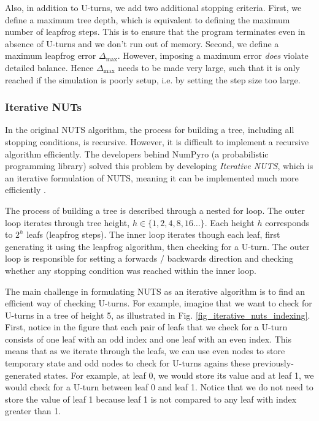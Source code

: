 \documentclass[12pt]{article}
\begin{document}
Also, in addition to U-turns, we add two additional stopping criteria. First, we define a maximum tree depth, which is equivalent to defining the maximum number of leapfrog steps. This is to ensure that the program terminates even in absence of U-turns and we don't run out of memory. Second, we define a maximum leapfrog error $\Delta_\text{max}$. However, imposing a maximum error \textit{does} violate detailed balance. Hence $\Delta_\text{max}$ needs to be made very large, such that it is only reached if the simulation is poorly setup, i.e. by setting the step size too large.

\subsubsection{Iterative NUTs}

In the original NUTS algorithm, the process for building a tree, including all stopping conditions, is recursive. However, it is difficult to implement a recursive algorithm efficiently. The developers behind NumPyro (a probabilistic programming library) solved this problem by developing \textit{Iterative NUTS}, which is an iterative formulation of NUTS, meaning it can be implemented much more efficiently \cite{numpyto}.

The process of building a tree is described through a nested for loop. The outer loop iterates through tree height, $h \in \{1, 2, 4, 8, 16 \ldots \}$. Each height $h$ corresponds to $2^h$ leafs (leapfrog steps). The inner loop iterates though each leaf, first generating it using the leapfrog algorithm, then checking for a U-turn. The outer loop is responsible for setting a forwards / backwards direction and checking whether any stopping condition was reached within the inner loop.

The main challenge in formulating NUTS as an iterative algorithm is to find an efficient way of checking U-turns. For example, imagine that we want to check for U-turns in a tree of height 5, as illustrated in Fig. \ref{fig_iterative_nuts_indexing}. First, notice in the figure that each pair of leafs that we check for a U-turn consists of one leaf with an odd index and one leaf with an even index. This means that as we iterate through the leafs, we can use even nodes to store temporary state and odd nodes to check for U-turns agains these previously-generated states. For example, at leaf 0, we would store its value and at leaf 1, we would check for a U-turn between leaf 0 and leaf 1. Notice that we do not need to store the value of leaf 1 because leaf 1 is not compared to any leaf with index greater than 1.
\end{document}
